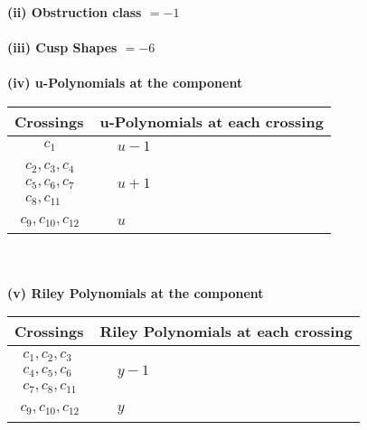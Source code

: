 \documentclass[1p]{elsarticle_modified}
\theoremstyle{definition}
\begin{document}
\flushleft \textbf{(ii) Obstruction class $= -1$}\\~\\
\flushleft \textbf{(iii) Cusp Shapes $= -6$}\\~\\
\newpage\renewcommand{\arraystretch}{1}
\flushleft \textbf{(iv) u-Polynomials at the component}\newline \\
\begin{tabular}{m{50pt}|m{274pt}}
Crossings & \hspace{64pt}u-Polynomials at each crossing \\
\hline $$\begin{aligned}c_{1}\end{aligned}$$&$\begin{aligned}
&u-1
\end{aligned}$\\
\hline $$\begin{aligned}c_{2},c_{3},c_{4}\\c_{5},c_{6},c_{7}\\c_{8},c_{11}\end{aligned}$$&$\begin{aligned}
&u+1
\end{aligned}$\\
\hline $$\begin{aligned}c_{9},c_{10},c_{12}\end{aligned}$$&$\begin{aligned}
&u
\end{aligned}$\\
\hline
\end{tabular}\\~\\
\newpage\renewcommand{\arraystretch}{1}
\flushleft \textbf{(v) Riley Polynomials at the component}\newline \\
\begin{tabular}{m{50pt}|m{274pt}}
Crossings & \hspace{64pt}Riley Polynomials at each crossing \\
\hline $$\begin{aligned}c_{1},c_{2},c_{3}\\c_{4},c_{5},c_{6}\\c_{7},c_{8},c_{11}\end{aligned}$$&$\begin{aligned}
&y-1
\end{aligned}$\\
\hline $$\begin{aligned}c_{9},c_{10},c_{12}\end{aligned}$$&$\begin{aligned}
&y
\end{aligned}$\\
\hline
\end{tabular}\\~\\
\end{document}
